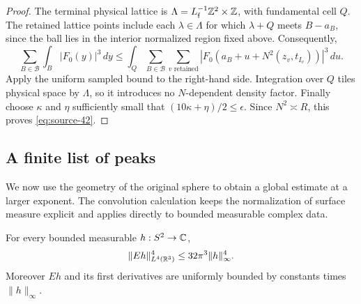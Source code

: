 \begin{proof}
The terminal physical lattice is
$\Lambda=L_{\mathrm f}^{-1}\mathbb Z^2\times\mathbb Z$, with fundamental cell $Q$.
The retained lattice points include each $\lambda\in\Lambda$ for which
$\lambda+Q$ meets $B-a_B$, since the ball lies in the interior
normalized region fixed above.
Consequently,
\[
 \sum_{B\in\mathcal B}\int_B|F_0(y)|^3\,dy
 \le\int_Q\sum_{B\in\mathcal B}\sum_{v\text{ retained}}
   |F_0(a_B+u+N^2(z_v,t_{I_v}))|^3\,du.
\]
Apply the uniform sampled bound to the right-hand side. Integration
over $Q$ tiles physical space by $\Lambda$, so it introduces no
$N$-dependent density factor. Finally choose
$\kappa$ and $\eta$ sufficiently small that
$(10\kappa+\eta)/2\le\epsilon$. Since $N^2\asymp R$, this proves
\eqref{eq:source-42}.
\end{proof}

\subsection{A finite list of peaks}

We now use the geometry of the original sphere to obtain a global
estimate at a larger exponent.  The convolution calculation keeps the
normalization of surface measure explicit and applies directly to
bounded measurable complex data.

\begin{lemma}\label{glob:fourth-power}
For every bounded measurable $h:S^2\to\mathbb C$,
\begin{equation}\label{glob:l4-bound}
       \|Eh\|_{L^4(\mathbb R^3)}^4\le32\pi^3\|h\|_\infty^4.
\end{equation}
Moreover $Eh$ and its first derivatives are uniformly bounded by
constants times $\|h\|_\infty$.
\end{lemma}

